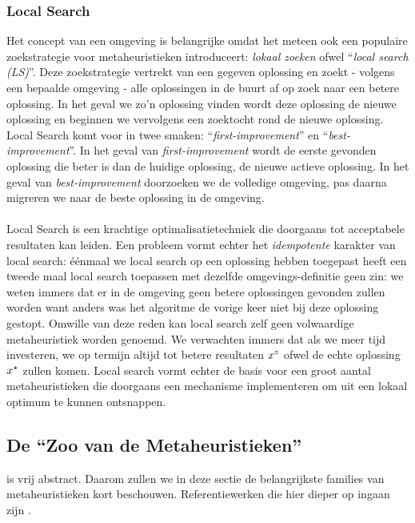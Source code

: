\subsubsection{Local Search}
Het concept van een omgeving is belangrijke omdat het meteen ook een populaire zoek\-strategie voor metaheuristieken introduceert: \emph{lokaal zoeken} ofwel ``\emph{local search (LS)}''. Deze zoekstrategie vertrekt van een gegeven oplossing en zoekt - volgens een bepaalde omgeving - alle oplossingen in de buurt af op zoek naar een betere oplossing. In het geval we zo'n oplossing vinden wordt deze oplossing de nieuwe oplossing en beginnen we vervolgens een zoektocht rond de nieuwe oplossing. Local Search komt voor in twee smaken: ``\emph{first-improvement}'' en ``\emph{best-improvement}''. In het geval van \emph{first-improvement} wordt de eerste gevonden oplossing die beter is dan de huidige oplossing, de nieuwe actieve oplossing. In het geval van \emph{best-improvement} doorzoeken we de volledige omgeving, pas daarna migreren we naar de beste oplossing in de omgeving.
\paragraph{}
Local Search is een krachtige optimalisatietechniek die doorgaans tot acceptabele resultaten kan leiden. Een probleem vormt echter het \emph{idempotente} karakter van local search: \'e\'enmaal we local search op een oplossing hebben toegepast heeft een tweede maal local search toepassen met dezelfde omgevings-definitie geen zin: we weten immers dat er in de omgeving geen betere oplossingen gevonden zullen worden want anders was het algoritme de vorige keer niet bij deze oplossing gestopt. Omwille van deze reden kan local search zelf geen volwaardige metaheuristiek worden genoemd\cite{lsAndMh}. We verwachten immers dat als we meer tijd investeren, we op termijn altijd tot betere resultaten $x^{\circ}$ ofwel de echte oplossing $x^{\star}$ zullen komen. Local search vormt echter de basis voor een groot aantal metaheuristieken die doorgaans een mechanisme implementeren om uit een lokaal optimum te kunnen ontsnappen.

\subsection{De ``Zoo van de Metaheuristieken''}

 is vrij abstract. Daarom zullen we in deze sectie de belangrijkste families van metaheuristieken kort beschouwen. Referentiewerken die hier dieper op ingaan zijn \cite{Glover2003,gendreau2010handbook,blum2003metaheuristics,osman:1996}.

